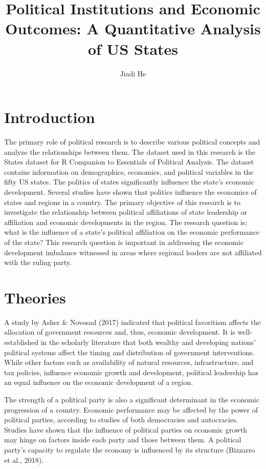 \documentclass[11pt]{article}
\title{Political Institutions and Economic Outcomes: A Quantitative Analysis of US States}
\author{Jiadi He}
\affil{Georgetown University}
\begin{document}
\maketitle
\keywordsline

\section{Introduction}

The primary role of political research is to describe various political concepts and analyze the relationships between them. The dataset used in this research is the States dataset for R Companion to Essentials of Political Analysis. The dataset contains information on demographics, economics, and political variables in the fifty US states. The politics of states significantly influence the state's economic development. Several studies have shown that politics influence the economics of states and regions in a country. The primary objective of this research is to investigate the relationship between political affiliations of state leadership or affiliation and economic developments in the region. The research question is; what is the influence of a state's political affiliation on the economic performance of the state? This research question is important in addressing the economic development imbalance witnessed in areas where regional leaders are not affiliated with the ruling party.

\section{Theories}

A study by Asher \& Novosad (2017) indicated that political favoritism affects the allocation of government resources and, thus, economic development. It is well-established in the scholarly literature that both wealthy and developing nations' political systems affect the timing and distribution of government interventions. While other factors such as availability of natural resources, infrastructure, and tax policies, influence economic growth and development, political leadership has an equal influence on the economic development of a region.

The strength of a political party is also a significant determinant in the economic progression of a country. Economic performance may be affected by the power of political parties, according to studies of both democracies and autocracies. Studies have shown that the influence of political parties on economic growth may hinge on factors inside each party and those between them. A political party's capacity to regulate the economy is influenced by its structure (Bizzarro et al., 2018).
\end{document}
